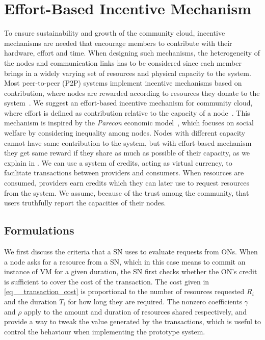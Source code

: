
 
\section{Effort-Based Incentive Mechanism}
\label{sec__incentives_design}

To ensure sustainability and growth of the community cloud, 
incentive mechanisms are needed that encourage members 
to contribute with their hardware, effort and time. 
When designing such mechanisms, the heterogeneity of the nodes and communication links has to be considered since each member brings in a widely varying set of resources and physical capacity to the system.
Most peer-to-peer (P2P) systems implement incentive mechanisms based on contribution, 
where nodes are rewarded according to resources they donate to the system~\cite{Shen2010}.
We suggest an effort-based incentive mechanism for community cloud, 
where effort is defined as contribution relative to the capacity of a node~\cite{Khan2015Incentive}. 
This mechanism is inspired by the \emph{Parecon} economic model~\cite{Albert2004Parecon, Rahman2010, Vega2013Sharing}, 
which focuses on social welfare by considering inequality among nodes. 
Nodes with different capacity cannot have same contribution to the system, 
but with effort-based mechanism they get same reward if they share as much as possible of their capacity, 
as we explain in .
We can use a system of credits, acting as virtual currency, 
to facilitate transactions between providers and consumers.
When resources are consumed, providers earn credits which they can later use to request resources from the system.
We assume, because of the trust among the community, that users truthfully report the capacities of their nodes.

\subsection{Formulations}
\label{sec__incentive_formulations}

We first discuss the criteria that a SN uses to evaluate requests from ONs.
When a node asks for a resource from a SN, which in this case means to commit an instance of VM for a given duration, the SN first checks whether the ON's credit is sufficient to cover the cost of the transaction.
The cost given in \cref{eq__transaction_cost} is proportional to the number of resources requested ${ R }_{ i }$ and the duration ${ T }_{ i }$ for how long they are required.
The nonzero coefficients $\gamma$ and $\rho$ apply to the amount and duration of resources shared respectively, 
and provide a way to tweak the value generated by the transactions, 
which is useful to control the behaviour when implementing the prototype system.

